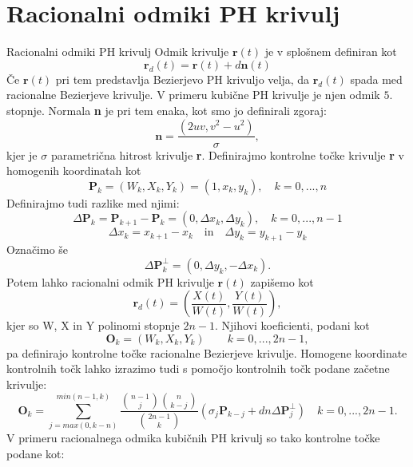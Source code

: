 \documentclass[12pt]{article}
\begin{document}
\section{Racionalni odmiki PH krivulj}
Racionalni odmiki PH krivulj
Odmik krivulje $\textbf{r}(t)$ je v splošnem definiran kot
$$\textbf{r}_d(t) = \textbf{r}(t) + d \textbf{n}(t)$$
Če $\textbf{r}(t)$ pri tem predstavlja Bezierjevo PH krivuljo velja, 
da $\textbf{r}_d(t)$ spada med racionalne Bezierjeve krivulje. V primeru kubične PH krivulje 
je njen odmik $5.$ stopnje. Normala \textbf{n} je pri tem enaka, kot smo jo definirali zgoraj:
$$\textbf{n} =\frac{(2uv, v^2 - u^2)}{\sigma},$$
kjer je $\sigma$ parametrična hitrost krivulje \textbf{r}.\newline
Definirajmo kontrolne točke krivulje \textbf{r} v homogenih koordinatah kot
$$ \textbf{P}_k = (W_k, X_k, Y_k) = (1, x_k, y_k), \quad k = 0, ..., n$$
Definirajmo tudi razlike med njimi:
$$\Delta \textbf{P}_k = \textbf{P}_{k+1}-\textbf{P}_k = (0, \Delta x_k, \Delta y_k), \quad k = 0, ..., n-1$$ 
$$\Delta x_k = x_{k+1} - x_k \quad \text{in} \quad \Delta y_k = y_{k+1} - y_k$$
Označimo še $$ \Delta \textbf{P}_k^{\perp} = (0, \Delta y_k, - \Delta x_k).$$ 
Potem lahko racionalni odmik PH krivulje $\textbf{r}(t)$ zapišemo kot
$$ \textbf{r}_d(t) = \left(\frac{X(t)}{W(t)}, \frac{Y(t)}{W(t)}\right),$$
kjer so W, X in Y polinomi stopnje $2n -1$. Njihovi koeficienti, podani kot
$$ \textbf{O}_k = (W_k, X_k, Y_k) \quad  \quad k = 0, ..., 2n-1,$$
pa definirajo kontrolne točke racionalne Bezierjeve krivulje. 
Homogene koordinate kontrolnih točk lahko izrazimo tudi s pomočjo kontrolnih točk podane začetne krivulje:
$$ \textbf{O}_k = \sum_{j=max(0,k-n)}^{min(n-1,k)}{\frac{\binom{n-1}{j}\binom{n}{k-j}}{\binom{2n-1}{k}}(\sigma_j \textbf{P}_{k-j}+d n \Delta \textbf{P}^{\perp}_{j})} \quad k = 0, ..., 2n-1.$$
\noindent V primeru racionalnega odmika kubičnih PH krivulj so tako kontrolne točke podane kot:
\end{document}
